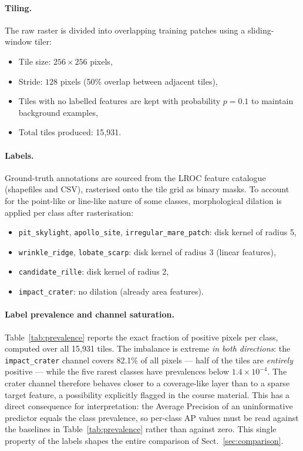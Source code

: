 \paragraph{Tiling.}
The raw raster is divided into overlapping training patches using a sliding-window tiler:
\begin{itemize}
    \item Tile size: $256 \times 256$ pixels,
    \item Stride: $128$ pixels (50\% overlap between adjacent tiles),
    \item Tiles with no labelled features are kept with probability $p=0.1$ to maintain background examples,
    \item Total tiles produced: 15{,}931.
\end{itemize}

\paragraph{Labels.}
Ground-truth annotations are sourced from the LROC feature catalogue (shapefiles and CSV), rasterised onto the tile grid as binary masks. To account for the point-like or line-like nature of some classes, morphological dilation is applied per class after rasterisation:
\begin{itemize}
    \item \texttt{pit\_skylight}, \texttt{apollo\_site}, \texttt{irregular\_mare\_patch}: disk kernel of radius 5,
    \item \texttt{wrinkle\_ridge}, \texttt{lobate\_scarp}: disk kernel of radius 3 (linear features),
    \item \texttt{candidate\_rille}: disk kernel of radius 2,
    \item \texttt{impact\_crater}: no dilation (already area features).
\end{itemize}

\paragraph{Label prevalence and channel saturation.}
Table~\ref{tab:prevalence} reports the exact fraction of positive pixels per class, computed over all 15{,}931 tiles. The imbalance is extreme \emph{in both directions}: the \texttt{impact\_crater} channel covers 82.1\% of all pixels --- half of the tiles are \emph{entirely} positive --- while the five rarest classes have prevalences below $1.4\times10^{-4}$. The crater channel therefore behaves closer to a coverage-like layer than to a sparse target feature, a possibility explicitly flagged in the course material. This has a direct consequence for interpretation: the Average Precision of an uninformative predictor equals the class prevalence, so per-class AP values must be read against the baselines in Table~\ref{tab:prevalence} rather than against zero. This single property of the labels shapes the entire comparison of Sect.~\ref{sec:comparison}.

